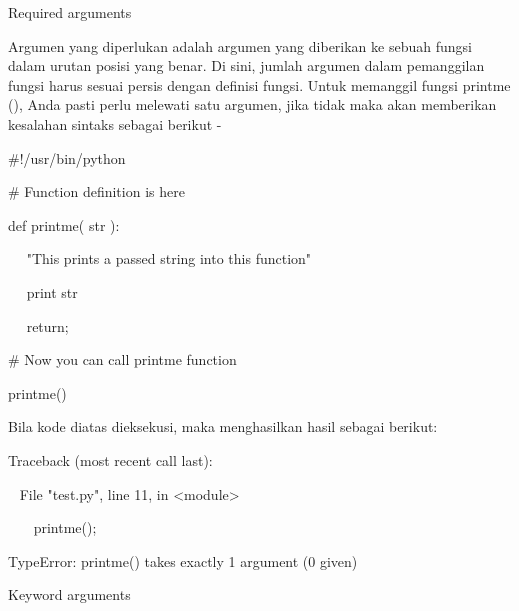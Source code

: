 \vspace{12pt}
\noindent 
Required arguments \par
\noindent 
Argumen yang diperlukan adalah argumen yang diberikan ke sebuah fungsi dalam urutan posisi yang benar. Di sini, jumlah argumen dalam pemanggilan fungsi harus sesuai persis dengan definisi fungsi. Untuk memanggil fungsi printme (), Anda pasti perlu melewati satu argumen, jika tidak maka akan memberikan kesalahan sintaks sebagai berikut - \par
\noindent 
 \hspace*{0.5in}  $  \#  $!/usr/bin/python \par
\vspace{12pt}
\noindent 
 \hspace*{0.5in}  $  \#  $ Function definition is here \par
\noindent 
 \hspace*{0.5in} def printme( str ): \par
\noindent 
~~  \hspace*{0.5in}  \hspace*{0.5in} "This prints a passed string into this function" \par
\noindent 
~~  \hspace*{0.5in} print str \par
\noindent 
~~  \hspace*{0.5in} return; \par
\vspace{12pt}
\noindent 
 \hspace*{0.5in}  $  \#  $ Now you can call printme function \par
\noindent 
 \hspace*{0.5in} printme() \par
\noindent 
Bila kode diatas dieksekusi, maka menghasilkan hasil sebagai berikut: \par
\noindent 
 \hspace*{0.5in} Traceback (most recent call last): \par
\noindent 
 \hspace*{0.5in} ~ File "test.py", line 11, in <module> \par
\noindent 
 \hspace*{0.5in} ~~~ printme(); \par
\noindent 
 \hspace*{0.5in} TypeError: printme() takes exactly 1 argument (0 given) \par
\vspace{12pt}
\noindent 
Keyword arguments \par
